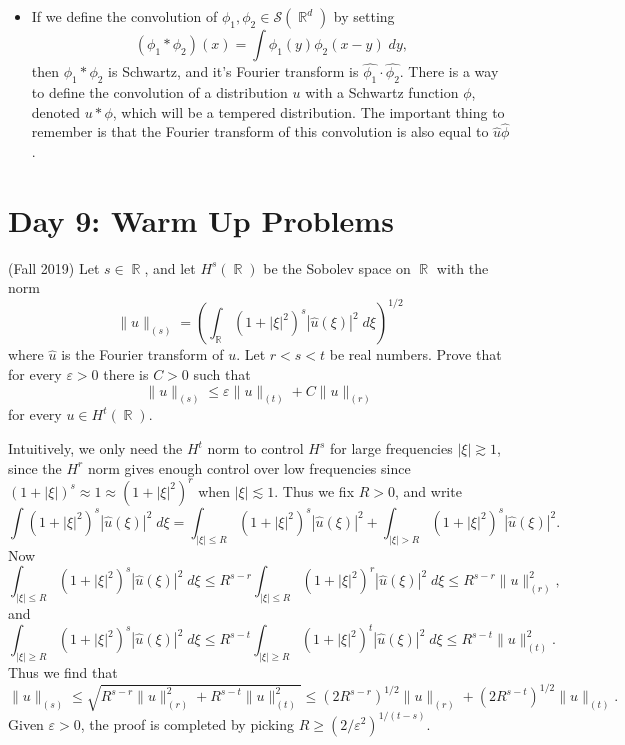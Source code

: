 \documentclass[answers]{exam}
\DeclareMathOperator{\RR}{\mathbb{R}}
\theoremstyle{problemstyle}
\newcommand{\1}[1]{\textbf{1}_{\left[#1\right]}} %
\begin{document}
\begin{questions}
\begin{itemize}
	\item If we define the convolution of $\phi_1, \phi_2 \in \mathcal{S}(\RR^d)$ by setting
	\[ (\phi_1 * \phi_2)(x) = \int \phi_1(y) \phi_2(x - y)\; dy, \]
	then $\phi_1 * \phi_2$ is Schwartz, and it's Fourier transform is $\widehat{\phi_1} \cdot \widehat{\phi_2}$. There is a way to define the convolution of a distribution $u$ with a Schwartz function $\phi$, denoted $u * \phi$, which will be a tempered distribution. The important thing to remember is that the Fourier transform of this convolution is also equal to $\widehat{u} \widehat{\phi}$.
\end{itemize}









\newpage
\section*{Day 9: Warm Up Problems}

\question (Fall 2019)
    Let $s \in \RR$, and let $H^s(\RR)$ be the Sobolev space on $\RR$ with the norm
    \[ \| u \|_{(s)} = \left( \int_{\RR} (1 + |\xi|^2)^s |\widehat{u}(\xi)|^2\; d\xi \right)^{1/2} \]
    where $\widehat{u}$ is the Fourier transform of $u$. Let $r < s < t$ be real numbers. Prove that for every $\varepsilon > 0$ there is $C > 0$ such that
    \[ \| u \|_{(s)} \leq \varepsilon \| u \|_{(t)} + C \| u \|_{(r)} \]
    for every $u \in H^t(\RR)$.
\begin{solution}
    Intuitively, we only need the $H^t$ norm to control $H^s$ for large frequencies $|\xi| \gtrsim 1$, since the $H^r$ norm gives enough control over low frequencies since $(1 + |\xi|)^s \approx 1 \approx (1 + |\xi|^2)^r$ when $|\xi| \lesssim 1$. Thus we fix $R > 0$, and write
    \[ \int (1 + |\xi|^2)^s |\widehat{u}(\xi)|^2\; d\xi = \int_{|\xi| \leq R} (1 + |\xi|^2)^s |\widehat{u}(\xi)|^2 + \int_{|\xi| > R} (1 + |\xi|^2)^s |\widehat{u}(\xi)|^2. \]
    Now
    \[ \int_{|\xi| \leq R} (1 + |\xi|^2)^s |\widehat{u}(\xi)|^2\; d\xi \leq R^{s-r} \int_{|\xi| \leq R} (1 + |\xi|^2)^r |\widehat{u}(\xi)|^2\; d\xi \leq R^{s-r} \| u \|_{(r)}^2, \]
    and
    \[ \int_{|\xi| \geq R} (1 + |\xi|^2)^s |\widehat{u}(\xi)|^2\; d\xi \leq R^{s-t} \int_{|\xi| \geq R} (1 + |\xi|^2)^t |\widehat{u}(\xi)|^2\; d\xi \leq R^{s-t} \| u \|_{(t)}^2. \]
    Thus we find that
    \[ \| u \|_{(s)} \leq \sqrt{R^{s-r} \| u \|_{(r)}^2 + R^{s-t} \| u \|_{(t)}^2} \leq (2R^{s-r})^{1/2} \| u \|_{(r)} + (2R^{s-t})^{1/2} \| u \|_{(t)}.  \]
    Given $\varepsilon > 0$, the proof is completed by picking $R \geq (2/\varepsilon^2)^{1/(t-s)}$.


\end{solution}
\end{questions}
\end{document}
